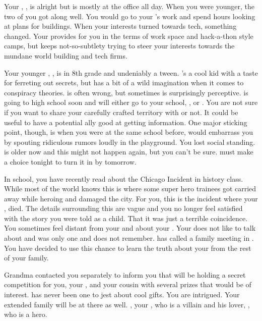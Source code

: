 \documentclass[char]{LRSguildcamp1}
\begin{document}
Your \cArchitect{\parent}, \cArchitect{}, is alright but is mostly at the office all day. When you were younger, the two of you got along well. You would go to your \cArchitect{\parent}'s work and spend hours looking at plans for buildings. When your interests turned towards tech, something changed. Your \cArchitect{\parent} provides for you in the terms of work space and hack-a-thon style camps, but keeps not-so-subtlety trying to steer your interests towards the mundane world building and tech firms. 

Your younger \cTween{\sibling}, \cTween{}, is in 8th grade and undeniably a tween. \cTween{}'s a cool kid with a taste for ferreting out secrets, but has a bit of a wild imagination when it comes to conspiracy theories. \cTween{\They} is often wrong, but sometimes is surprisingly perceptive. \cTween{} is going to high school soon and will either go to your school, \pNormalSchool{}, or \pSuperSchool{}. You are not sure if you want to share your carefully crafted territory with \cTween{\them} or not. It could be useful to have a potential ally good at getting information. One major sticking point, though, is when you were at the same school before, \cTween{} would embarrass you by spouting ridiculous rumors loudly in the playground. You lost social standing. \cTween{} is older now and this might not happen again, but you can't be sure. \cTween{} must make a choice tonight to turn it in by tomorrow.

In school, you have recently read about the Chicago Incident in history class. While most of the world knows this is where some super hero trainees got carried away while heroing and damaged the city. For you, this is the incident where your \cAS{\parent},\cAS{} died. The details surrounding this are vague and you no longer feel satisfied with the story you were told as a child. That it was just a terrible coincidence. You sometimes feel distant from your\cArchitect{\parent} and \cTween{} about your \cAS{\parent}. Your \cArchitect{\parent} does not like to talk about \cAS{} and \cTween{} was only one and does not remember. \cGrandma{} has called a family meeting in \pCityGrandma{}. You have decided to use this chance to learn the truth about your \cAS{\parent} from the rest of your family. 

Grandma contacted you separately to inform you that \cGrandma{\they} will be holding a secret competition for you, your \cTween{\sibling}, and your cousin with several prizes that would be of interest. \cGrandma{} has never been one to jest about cool gifts. You are intrigued.  Your extended family will be at there as well. \cOldest{}, your \cOldest{\uncle}, who is a villain and his lover, \cOS{}, who is a hero.
 
\end{document}
